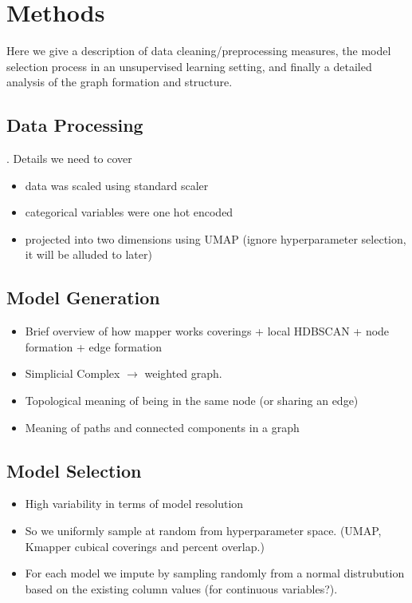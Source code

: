 \section{Methods}

Here we give a description of data cleaning/preprocessing measures, the model selection 
process in an unsupervised learning setting, and finally a detailed analysis of the 
graph formation and structure. 


\subsection{Data Processing}

. 
Details we need to cover
\begin{itemize}
    \item data was scaled using standard scaler 
    \item categorical variables were one hot encoded 
    \item projected into two dimensions using UMAP (ignore hyperparameter selection, 
    it will be alluded to later)
\end{itemize}


\subsection{Model Generation}

\begin{itemize}
    \item Brief overview of how mapper works coverings + local HDBSCAN + node formation + edge formation
    \item Simplicial Complex $\to$ weighted graph.
    \item Topological meaning of being in the same node (or sharing an edge)
    \item Meaning of paths and connected components in a graph 
\end{itemize}


\subsection{Model Selection}
\begin{itemize}
\item High variability in terms of model resolution
\item So we uniformly sample at random
from hyperparameter space. (UMAP, Kmapper cubical coverings and percent overlap.)
\item For each model we impute by sampling randomly from a normal distrubution based on
the existing column values (for continuous variables?).
\end{itemize}



